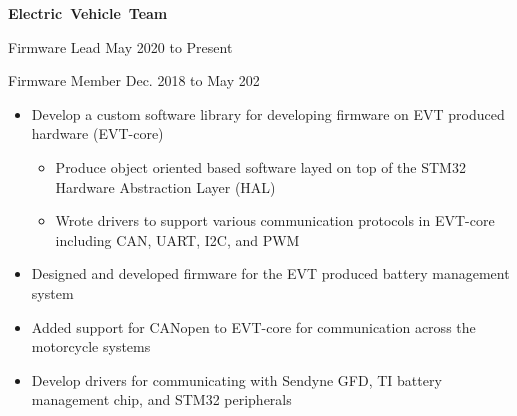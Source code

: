 \documentclass{article}
\newcommand{\rSubSubSection}[1] {
  \textbf{{\fontsize{0.35cm}{0.45cm}\selectfont \hbox{#1}}}
}
\begin{document}
\rSubSubSection{Electric Vehicle Team}\par
Firmware Lead \hfill May 2020 to Present \par
Firmware Member \hfill Dec. 2018 to May 202
\vspace{-10pt}
\begin{itemize}
    \setlength\itemsep{0pt}
    \setlength{\parskip}{0pt}
    \item Develop a custom software library for developing firmware on EVT produced hardware (EVT-core)
    \begin{itemize}
        \setlength\itemsep{0pt}
        \setlength{\parskip}{0pt}
        \item Produce object oriented based software layed on top of the STM32 Hardware Abstraction Layer (HAL)
        \item Wrote drivers to support various communication protocols in EVT-core including CAN, UART, I2C, and PWM
    \end{itemize}
    \item Designed and developed firmware for the EVT produced battery management system
    \item Added support for CANopen to EVT-core for communication across the motorcycle systems
    \item Develop drivers for communicating with Sendyne GFD, TI battery management chip, and STM32 peripherals
\end{itemize}
\vspace{-10pt}
\end{document}

